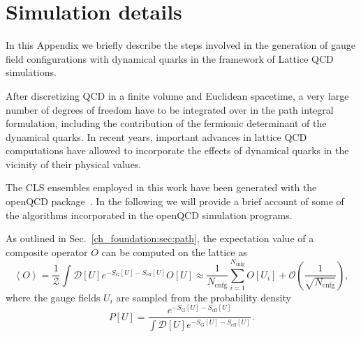 
\chapter{Simulation details}
\label{appex_simulations}

In this Appendix we briefly describe the steps involved in the generation of gauge field configurations with dynamical quarks in the framework of Lattice QCD simulations.

After discretizing QCD in a finite volume and Euclidean spacetime, a very large number of degrees of freedom have to be integrated over in the path integral formulation, including the contribution of the fermionic determinant of the dynamical quarks. In recent years, important advances in lattice QCD computations have allowed to incorporate the effects of dynamical quarks in the vicinity of their physical values.

The CLS ensembles employed in this work have been generated with the openQCD package~\citep{Luscher:2012av,Luscher:2010ae}. In the following we will provide a brief account of some of the algorithms incorporated in the openQCD simulation programs.

As outlined in Sec.~\ref{ch_foundation:sec:path}, the expectation value of a composite operator $O$ can be computed on the lattice as
\begin{equation}
\left<O\right>=\frac{1}{\mathcal{Z}}\int\mathcal{D}[U]e^{-S_{\textrm{G}}[U]-S_{\textrm{eff}}[U]}O[U]\approx\frac{1}{N_{\textrm{cnfg}}}\sum_{i=1}^{N_{\textrm{cnfg}}}O[U_i]+\mathcal{O}\left(\frac{1}{\sqrt{N_{\textrm{cnfg}}}}\right),
\end{equation}
where the gauge fields $U_i$ are sampled from the probability density
\begin{equation}
\label{appex_simulations:eq:PU}
P[U]=\frac{e^{-S_{\textrm{G}}[U]-S_{\textrm{eff}}[U]}}{\int\mathcal{D}[U]e^{-S_{\textrm{G}}[U]-S_{\textrm{eff}}[U]}}.
\end{equation}

